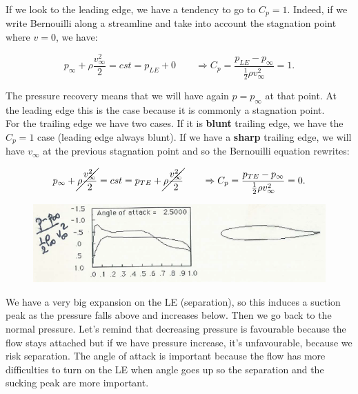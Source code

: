 			If we look to the leading edge, we have a tendency to go to $C_p = 1$. Indeed, if we write Bernouilli along a streamline and take into account the stagnation point where $v=0$, we have:
			
			\begin{equation}
			p_\infty + \rho \frac{v_\infty ^2}{2} = cst = p_{LE} + 0 \qquad \Rightarrow C_p = \frac{p_{LE}-p_\infty}{\frac{1}{2}\rho v_\infty ^2} = 1.
			\end{equation}						
			
			The pressure recovery means that we will have again $p = p_\infty$ at that point. At the leading edge this is the case because it is commonly a stagnation point. \\ 

For the trailing edge we have two cases. If it is \textbf{blunt} trailing edge, we have the $C_p = 1$ case (leading edge always blunt). If we have a \textbf{sharp} trailing edge, we will have $v_\infty$ at the previous stagnation point and so the Bernouilli equation rewrites:

			\begin{equation}
			p_\infty + \cancel{\rho \frac{v_\infty ^2}{2}} = cst = p_{TE} + \cancel{\rho \frac{v_\infty ^2}{2}} \qquad \Rightarrow C_p = \frac{p_{TE}-p_\infty}{\frac{1}{2}\rho v_\infty ^2} = 0.
			\end{equation}
			
			\begin{figure}
			\vspace{-5mm}
			\includegraphics[scale=0.5]{ch2/5}
			\end{figure}
			We have a very big expansion on the LE (separation), so this induces a suction peak as the pressure falls above and increases below. Then we go back to the normal pressure. Let’s remind that decreasing pressure is favourable because the flow stays attached but if we have pressure increase, it's unfavourable, because we risk separation.
The angle of attack is important because the flow has more difficulties to turn on the LE  when angle goes up so the separation and the sucking peak are more important.\\

